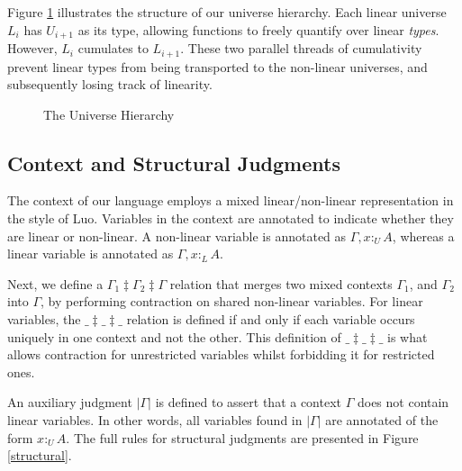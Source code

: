 \documentclass[sigplan,screen,review,authordraft]{acmart}
\newcommand{\pure}[1]{|#1|}
\newcommand{\utype}{:_{\scriptscriptstyle U}}
\newcommand{\ltype}{:_{\scriptscriptstyle L}}
\newcommand{\mrg}[3]{#1\ddagger#2\ddagger#3}
\begin{document}
Figure \ref{universe} illustrates the structure of our universe hierarchy. Each linear universe $L_i$ has $U_{i+1}$ as its type, allowing functions to freely quantify over linear \textit{types}. However, $L_i$ cumulates to $L_{i+1}$. These two parallel threads of cumulativity prevent linear types from being transported to the non-linear universes, and subsequently losing track of linearity.

\begin{figure}[h]
  \caption{The Universe Hierarchy}
  \vspace{1em}
  \centering
  \label{universe}
  \Description{}
\end{figure}

\subsection{Context and Structural Judgments}
The context of our language employs a mixed linear/non-linear representation in the style of Luo\cite{luo}. Variables in the context are annotated to indicate whether they are linear or non-linear. A non-linear variable is annotated as $\Gamma, x \utype A$, whereas a linear variable is annotated as $\Gamma, x \ltype A$.

Next, we define a $\mrg{\Gamma_1}{\Gamma_2}{\Gamma}$ relation that merges two mixed contexts $\Gamma_1$, and $\Gamma_2$ into $\Gamma$, by performing contraction on shared non-linear variables. For linear variables, the $\mrg{\_}{\_}{\_}$ relation is defined if and only if each variable occurs uniquely in one context and not the other. This definition of $\mrg{\_}{\_}{\_}$ is what allows contraction for unrestricted variables whilst forbidding it for restricted ones.

An auxiliary judgment $\pure{\Gamma}$ is defined to assert that a context $\Gamma$ does not contain linear variables. In other words, all variables found in $\pure{\Gamma}$ are annotated of the form $x \utype A$. The full rules for structural judgments are presented in Figure \ref{structural}.
\end{document}
